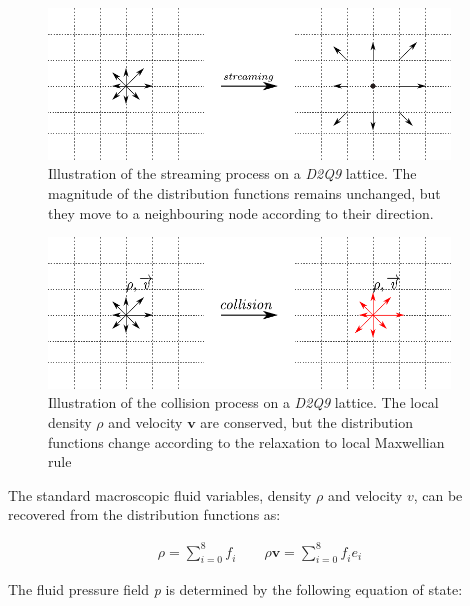 \begin{figure}[htpb]
\centering
\includegraphics[width=0.95\textwidth]{stream}
\caption[Illustration of the streaming process on a \textit{D2Q9} 
lattice]{Illustration of the streaming process on a \textit{D2Q9} lattice. The 
magnitude of the distribution functions remains unchanged, but they move to a 
neighbouring node according to their direction.}
\label{fig:stream}
\end{figure}

\begin{figure}[htbp]
\centering
\includegraphics[width=0.95\textwidth]{collision}
\caption[Illustration of the collision process on a \textit{D2Q9} 
lattice]{Illustration of the collision process on a \textit{D2Q9} lattice. The 
local density $\rho$ and velocity $\mathbf{v}$ are conserved, but the 
distribution functions change according to the relaxation to local Maxwellian 
rule}
\label{fig:collision}
\end{figure} 

The standard macroscopic fluid variables, density $\rho$ and velocity 
$\mathbf{\mathit{ v}}$, can be recovered from the distribution functions as:

\begin{align}
\rho = \sum\limits_{\mathit{i}=0}^{8}{\mathit{f_i}} \qquad \rho \mathbf{v} = \sum\limits_{\mathit{i}=0}^{8}{\mathit{f_i}}\mathbf{\mathit{e_i}}
\end{align}

The fluid pressure field \textit{p} is determined by the following equation of 
state:

